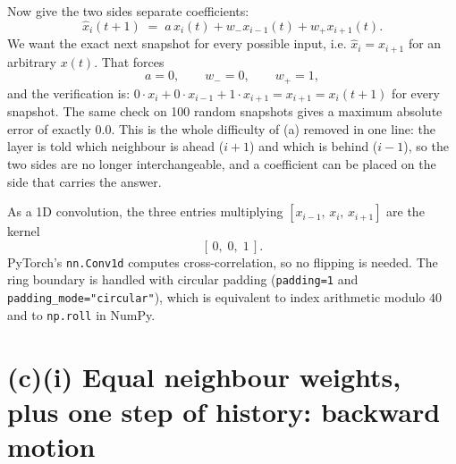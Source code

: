 \documentclass[11pt,letterpaper]{article}
\begin{document}
Now give the two sides separate coefficients:
\begin{equation*}
\hat{x}_i(t+1) \;=\; a\, x_i(t) + w_{-} x_{i-1}(t) + w_{+} x_{i+1}(t).
\end{equation*}
We want the exact next snapshot for every possible input, i.e. $\hat{x}_i = x_{i+1}$ for an
arbitrary $x(t)$. That forces
\begin{equation*}
\boxed{a = 0, \qquad w_{-} = 0, \qquad w_{+} = 1,}
\end{equation*}
and the verification is: $0 \cdot x_i + 0 \cdot x_{i-1} + 1 \cdot x_{i+1} =
x_{i+1} = x_i(t+1)$ for every snapshot. The same check on 100 random snapshots gives a maximum
absolute error of exactly $0.0$. This is the whole difficulty of (a) removed in one line: the
layer is told which neighbour is ahead ($i+1$) and which is behind ($i - 1$), so the two sides
are no longer interchangeable, and a coefficient can be placed on the side that carries the
answer.

As a 1D convolution, the three entries multiplying
$[x_{i-1},\, x_i,\, x_{i+1}]$ are the kernel
\begin{equation*}
\boxed{[\,0,\; 0,\; 1\,]} .
\end{equation*}
PyTorch's \texttt{nn.Conv1d} computes cross-correlation, so no flipping is needed. The ring
boundary is handled with circular padding (\texttt{padding=1} and
\texttt{padding\_mode="circular"}), which is equivalent to index arithmetic modulo $40$ and to
\texttt{np.roll} in NumPy.

\section*{(c)(i) Equal neighbour weights, plus one step of history: backward motion}
\end{document}
